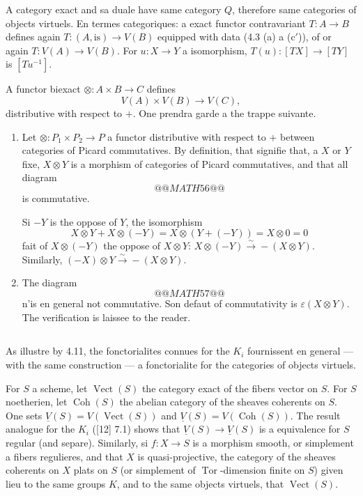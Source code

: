 \documentclass[12pt,a4paper]{article}
\theoremstyle{plain}
\theoremstyle{definition}
\DeclareMathOperator{\Vect}{Vect}
\DeclareMathOperator{\Coh}{Coh}
\DeclareMathOperator{\Tor}{Tor}
\begin{document}
A category exact and sa duale have same category $Q$, therefore same categories
of objects virtuels. En termes categoriques: a exact functor contravariant
$T: A \to B$ defines again $T: (A, \text{is}) \to V(B)$ equipped with data (4.3 (a) a (c$'$)), of or
again $T: V(A) \to V(B)$. For $u: X \to Y$ a isomorphism, $T(u): [TX] \to [TY]$
is $[Tu^{-1}]$.

A functor biexact $\otimes: A \times B \to C$ defines
\[
V(A) \times V(B) \to V(C) ,
\]
distributive with respect to $+$. One prendra garde a the trappe suivante.

\begin{enumerate}[label=(\alph*)]
\item Let $\otimes: P_1 \times P_2 \to P$ a functor distributive with respect to $+$ between categories
of Picard commutatives. By definition, that signifie that, a $X$ or $Y$ fixe,
$X \otimes Y$ is a morphism of categories of Picard commutatives, and that all diagram
\[
@@MATH56@@
\]
is commutative.

Si $-Y$ is the oppose of $Y$, the isomorphism
\[
X \otimes Y + X \otimes (-Y) = X \otimes (Y + (-Y)) = X \otimes 0 = 0
\]
fait of $X \otimes (-Y)$ the oppose of $X \otimes Y$: $X \otimes (-Y) \xrightarrow{\sim} -(X \otimes Y)$. Similarly, $(-X) \otimes
Y \xrightarrow{\sim} -(X \otimes Y)$.

\item The diagram
\[
@@MATH57@@
\]
n'is en general not commutative. Son defaut of commutativity is $\varepsilon(X \otimes Y)$.
The verification is laissee to the reader.
\end{enumerate}

\subsection{}

As illustre by 4.11, the fonctorialites connues for the $K_i$ fournissent
en general --- with the same construction --- a fonctorialite for the categories of objects
virtuels.

For $S$ a scheme, let $\Vect(S)$ the category exact of the fibers vector
on $S$. For $S$ noetherien, let $\Coh(S)$ the abelian category of the sheaves
coherents on $S$. One sets $\underline{V}(S) = V(\Vect(S))$ and $\underline{V}(S) = V(\Coh(S))$. The result
analogue for the $K_i$ ([12] 7.1) shows that $\underline{V}(S) \to \underline{V}(S)$ is a equivalence
for $S$ regular (and separe). Similarly, si $f: X \to S$ is a morphism smooth,
or simplement a fibers regulieres, and that $X$ is quasi-projective, the category
of the sheaves coherents on $X$ plats on $S$ (or simplement of $\Tor$-dimension
finite on $S$) given lieu to the same groups $K$, and to the same objects virtuels,
that $\Vect(S)$.
\end{document}
